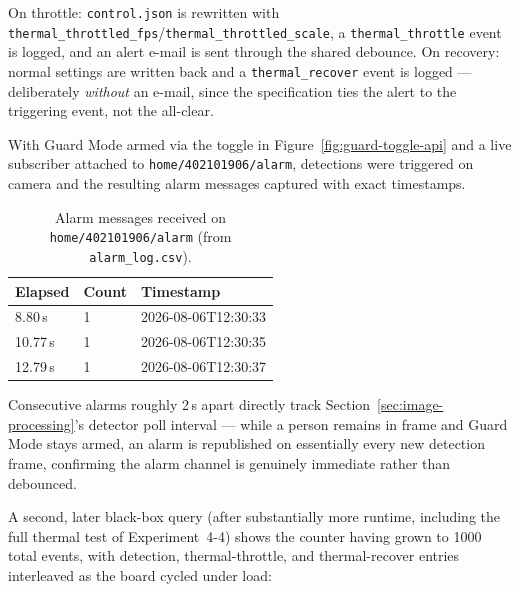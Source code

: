 On throttle: \texttt{control.json} is rewritten with
\texttt{thermal\_throttled\_fps}/\texttt{thermal\_throttled\_scale}, a
\texttt{thermal\_throttle} event is logged, and an alert e-mail is sent
through the shared debounce. On recovery: normal settings are written
back and a \texttt{thermal\_recover} event is logged --- deliberately
\emph{without} an e-mail, since the specification ties the alert to the
triggering event, not the all-clear.

\label{sec:exp-4-1}

With Guard Mode armed via the toggle in Figure~\ref{fig:guard-toggle-api}
and a live subscriber attached to \texttt{home/402101906/alarm},
detections were triggered on camera and the resulting alarm messages
captured with exact timestamps.

\begin{table}[H]
\centering
\caption{Alarm messages received on \texttt{home/402101906/alarm} (from \texttt{alarm\_log.csv}).}
\label{tab:guard-alarm-log}
\begin{tabular}{lll}
\toprule
\textbf{Elapsed} & \textbf{Count} & \textbf{Timestamp} \\
\midrule
8.80\,s & 1 & 2026-08-06T12:30:33 \\
10.77\,s & 1 & 2026-08-06T12:30:35 \\
12.79\,s & 1 & 2026-08-06T12:30:37 \\
\bottomrule
\end{tabular}
\end{table}

Consecutive alarms roughly 2\,s apart directly track
Section~\ref{sec:image-processing}'s detector poll interval --- while a
person remains in frame and Guard Mode stays armed, an alarm is
republished on essentially every new detection frame, confirming the
alarm channel is genuinely immediate rather than debounced.

\label{sec:exp-4-2}

A second, later black-box query (after substantially more runtime,
including the full thermal test of Experiment~4-4) shows the counter
having grown to 1000 total events, with detection, thermal-throttle, and
thermal-recover entries interleaved as the board cycled under load:

